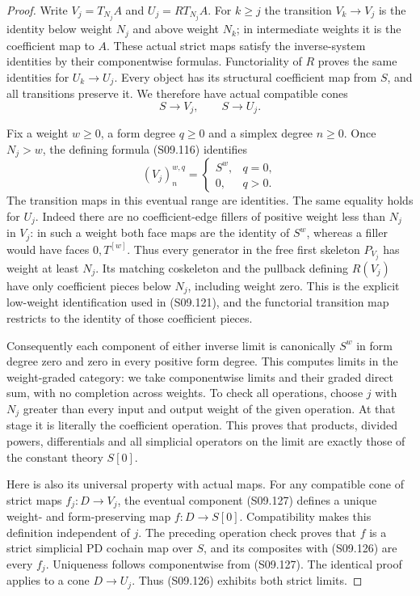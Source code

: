 \begin{proof}
Write $V_j=T_{N_j}A$ and $U_j=R T_{N_j}A$.
For $k\geq j$ the transition $V_k\to V_j$ is the
identity below weight $N_j$ and above weight $N_k$;
in intermediate weights it is the coefficient map to $A$.
These actual strict maps satisfy the inverse-system identities
by their componentwise formulas.  Functoriality of $R$
proves the same identities for $U_k\to U_j$.
Every object has its structural coefficient map from $S$,
and all transitions preserve it.  We therefore have actual
compatible cones
\[
                 S\longrightarrow V_j,\qquad
                 S\longrightarrow U_j.
 \tag{S09.126}
\]

Fix a weight $w\geq0$, a form degree $q\geq0$ and a
simplex degree $n\geq0$.  Once $N_j>w$, the defining
formula (S09.116) identifies
\[
 (V_j)_n^{w,q}=
 \begin{cases}S^w,&q=0,\\0,&q>0.\end{cases}
 \tag{S09.127}
\]
The transition maps in this eventual range are identities.
The same equality holds for $U_j$.  Indeed there are no
coefficient-edge fillers of positive weight less than $N_j$
in $V_j$: in such a weight both face maps are the identity
of $S^w$, whereas a filler would have faces $0,T^{[w]}$.
Thus every generator in the free first skeleton $P_{V_j}$
has weight at least $N_j$.  Its matching coskeleton and
the pullback defining $R(V_j)$ have only coefficient
pieces below $N_j$, including weight zero.
This is the explicit low-weight identification used in
(S09.121), and the functorial transition map restricts to
the identity of those coefficient pieces.

Consequently each component of either inverse limit is
canonically $S^w$ in form degree zero and zero in every
positive form degree.  This computes limits in the
weight-graded category: we take componentwise limits and
their graded direct sum, with no completion across weights.
To check all operations, choose $j$ with $N_j$ greater
than every input and output weight of the given operation.
At that stage it is literally the coefficient operation.
This proves that products, divided powers, differentials
and all simplicial operators on the limit are exactly
those of the constant theory $S[0]$.

Here is also its universal property with actual maps.
For any compatible cone of strict maps $f_j:D\to V_j$,
the eventual component (S09.127) defines a unique
weight- and form-preserving map $f:D\to S[0]$.
Compatibility makes this definition independent of $j$.
The preceding operation check proves that $f$ is a strict
simplicial PD cochain map over $S$, and its composites with
(S09.126) are every $f_j$.  Uniqueness follows componentwise
from (S09.127).  The identical proof applies to a cone
$D\to U_j$.  Thus (S09.126) exhibits both strict limits.


\end{proof}
